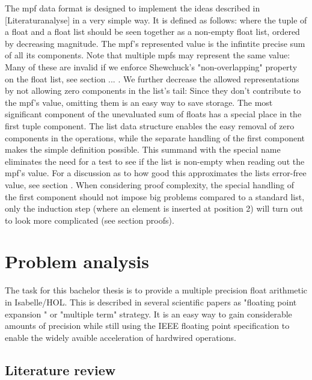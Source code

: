 \documentclass[11pt,a4paper]{article}
\begin{document}
The mpf data format is designed to implement the ideas described in [Literaturanalyse] in a very simple way. It is defined as follows:
\mpfdef
where the tuple of a float and a float list should be seen together as a non-empty float list, ordered by decreasing magnitude. The mpf's represented value is the infintite precise sum of all its components. Note that multiple mpfs may represent the same value:
Many of these are invalid if we enforce Shewchuck's "non-overlapping" property on the float list, see section ... . We further decrease the allowed representations by not allowing zero components in the list's tail: Since they don't contribute to the mpf's value, omitting them is an easy way to save storage.
The most significant component of the unevaluated sum of floats has a special place in the first tuple component. The list data structure enables the easy removal of zero components in the operations, while the separate handling of the first component makes the simple definition
\newline
\approxdef
\newline
possible. This summand with the special name \constapprox eliminates the need for a test to see if the list is non-empty when reading out the mpf's value. For a discussion as to how good this approximates the lists error-free value, see section     . When considering proof complexity, the special handling of the first component should not impose big problems compared to a standard list, only the induction step (where an element is inserted at position 2) will turn out to look more complicated (see section proofs).

\section{Problem analysis}

The task for this bachelor thesis is to provide a multiple precision float arithmetic in Isabelle/HOL. This is described in several scientific papers as "floating point expansion " or "multiple term" strategy. It is an easy way to gain considerable amounts of precision while still using the IEEE floating point specification to enable the widely avaible acceleration of hardwired operations.

\subsection{Literature review}
\end{document}
